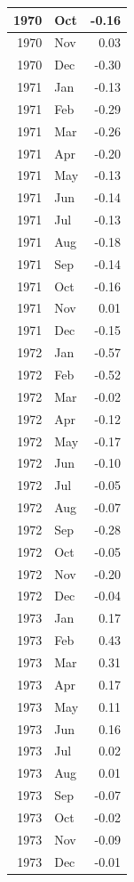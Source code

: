 \documentclass[
]{article}
\begin{document}
\begin{table}[H]
\begin{tabular}[t]{r|l|r}
\hline
1970 & Oct & -0.16\\
\hline
1970 & Nov & 0.03\\
\hline
1970 & Dec & -0.30\\
\hline
1971 & Jan & -0.13\\
\hline
1971 & Feb & -0.29\\
\hline
1971 & Mar & -0.26\\
\hline
1971 & Apr & -0.20\\
\hline
1971 & May & -0.13\\
\hline
1971 & Jun & -0.14\\
\hline
1971 & Jul & -0.13\\
\hline
1971 & Aug & -0.18\\
\hline
1971 & Sep & -0.14\\
\hline
1971 & Oct & -0.16\\
\hline
1971 & Nov & 0.01\\
\hline
1971 & Dec & -0.15\\
\hline
1972 & Jan & -0.57\\
\hline
1972 & Feb & -0.52\\
\hline
1972 & Mar & -0.02\\
\hline
1972 & Apr & -0.12\\
\hline
1972 & May & -0.17\\
\hline
1972 & Jun & -0.10\\
\hline
1972 & Jul & -0.05\\
\hline
1972 & Aug & -0.07\\
\hline
1972 & Sep & -0.28\\
\hline
1972 & Oct & -0.05\\
\hline
1972 & Nov & -0.20\\
\hline
1972 & Dec & -0.04\\
\hline
1973 & Jan & 0.17\\
\hline
1973 & Feb & 0.43\\
\hline
1973 & Mar & 0.31\\
\hline
1973 & Apr & 0.17\\
\hline
1973 & May & 0.11\\
\hline
1973 & Jun & 0.16\\
\hline
1973 & Jul & 0.02\\
\hline
1973 & Aug & 0.01\\
\hline
1973 & Sep & -0.07\\
\hline
1973 & Oct & -0.02\\
\hline
1973 & Nov & -0.09\\
\hline
1973 & Dec & -0.01\\

\end{tabular}
\end{table}
\end{document}
